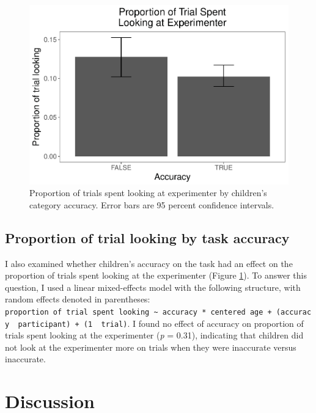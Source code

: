 \documentclass[floatsintext,man]{apa6}
\theoremstyle{definition}
\theoremstyle{definition}
\theoremstyle{definition}
\theoremstyle{remark}
\begin{document}
\begin{figure}
\centering
\includegraphics{soc_ref_category_paper_files/figure-latex/accuracylooking-1.pdf}
\caption{\label{fig:accuracylooking}Proportion of trials spent looking at
experimenter by children's category accuracy. Error bars are 95 percent
confidence intervals.}
\end{figure}

\subsection{Proportion of trial looking by task
accuracy}\label{proportion-of-trial-looking-by-task-accuracy}

I also examined whether children's accuracy on the task had an effect on
the proportion of trials spent looking at the experimenter (Figure
\ref{fig:accuracylooking}). To answer this question, I used a linear
mixed-effects model with the following structure, with random effects
denoted in parentheses:
\texttt{proportion\ of\ trial\ spent\ looking\ \textasciitilde{}\ accuracy\ *\ centered\ age\ +\ (accuracy\ \textbar{}\ participant)\ +\ (1\ \textbar{}\ trial)}.
I found no effect of accuracy on proportion of trials spent looking at
the experimenter (\emph{p} = 0.31), indicating that children did not
look at the experimenter more on trials when they were inaccurate versus
inaccurate.

\section{Discussion}\label{discussion}
\end{document}
